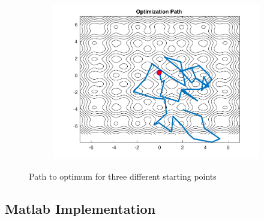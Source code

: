 \documentclass{article}
\begin{document}
\begin{figure}[h]
\begin{subfigure}{0.3\textwidth}
\includegraphics[width=\linewidth]{path3}
\caption{}
\label{fig:path3}
\end{subfigure}
\caption{Path to optimum for three different starting points}
\label{fig:paths}
\end{figure}

\subsection{Matlab Implementation}
\inputminted[xleftmargin=10pt, linenos]{matlab}{simAnnealObj2.m}
\end{document}

